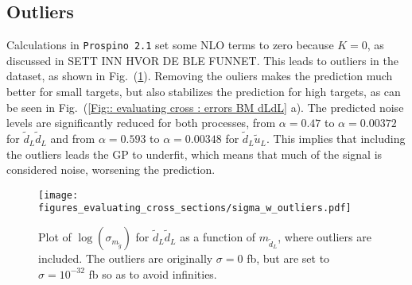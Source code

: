 \documentclass[twoside,english]{uiofysmaster}
\begin{document}


\subsection{Outliers}

Calculations in \verb|Prospino 2.1| set some NLO terms to zero because $K=0$, as discussed in SETT INN HVOR DE BLE FUNNET. This leads to outliers in the dataset, as shown in Fig.\ (\ref{Fig:: evaluating cross : sigma w outliers}). Removing the ouliers makes the prediction much better for small targets, but also stabilizes the prediction for high targets, as can be seen in Fig.\ (\ref{Fig:: evaluating cross : errors BM dLdL} a). The predicted noise levels are significantly reduced for both processes, from $\alpha = 0.47$ to $\alpha = 0.00372$ for $\tilde{d}_L \tilde{d}_L$ and from $\alpha = 0.593$ to $\alpha= 0.00348$ for $\tilde{d}_L \tilde{u}_L$. This implies that including the outliers leads the GP to underfit, which means that much of the signal is considered noise, worsening the prediction.   


\begin{figure}[H]
\centering
\texttt{[image: figures\_evaluating\_cross\_sections/sigma\_w\_outliers.pdf]}
\caption{Plot of $\log( \sigma_{m_{\tilde{g}}})$ for $\tilde{d}_L \tilde{d}_L$ as a function of $m_{\tilde{d}_L}$, where outliers are included. The outliers are originally $\sigma=0$ fb, but are set to $\sigma =10^{-32}$ fb so as to avoid infinities.}
\label{Fig:: evaluating cross : sigma w outliers}
\end{figure}
\end{document}

